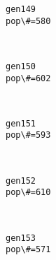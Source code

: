 \documentclass[11pt]{article}
\begin{document}
    \begin{Verbatim}[commandchars=\\\{\}]
gen149
pop\#=580

    \end{Verbatim}

    \begin{center}
    \end{center}
    { \hspace*{\fill} \\}
    
    \begin{Verbatim}[commandchars=\\\{\}]
gen150
pop\#=602

    \end{Verbatim}

    \begin{center}
    \end{center}
    { \hspace*{\fill} \\}
    
    \begin{Verbatim}[commandchars=\\\{\}]
gen151
pop\#=593

    \end{Verbatim}

    \begin{center}
    \end{center}
    { \hspace*{\fill} \\}
    
    \begin{Verbatim}[commandchars=\\\{\}]
gen152
pop\#=610

    \end{Verbatim}

    \begin{center}
    \end{center}
    { \hspace*{\fill} \\}
    
    \begin{Verbatim}[commandchars=\\\{\}]
gen153
pop\#=571

    \end{Verbatim}
\end{document}
